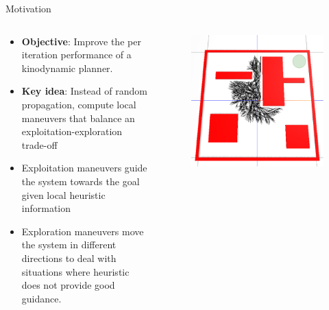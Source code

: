 \begin{columns}[t]
	\begin{column}{0.5\textwidth}
		\begin{block}{\large Motivation}
		    \begin{columns}[t]
			    \begin{column}{0.62\textwidth}
			    	\vspace{-0.2in}
					    \begin{itemize}
							\item \textbf{Objective}: Improve the per iteration performance of a kinodynamic planner.
					    	\item \textbf{Key idea}: Instead of random propagation, compute local maneuvers that balance an exploitation-exploration trade-off
					    	\item Exploitation maneuvers guide the system towards the goal given local heuristic information
					    	\item Exploration maneuvers move the system in different directions to deal with situations where heuristic does not provide good guidance.
					    \end{itemize}
			    \end{column}
			    \begin{column}{0.35\textwidth}
			    	\vspace{-0.2in}
			    	\centering
					\begin{figure}
					\includegraphics[scale=0.5]{figures/curated.eps}

\end{figure}
\end{column}
\end{columns}
\end{block}
\end{column}
\end{columns}
